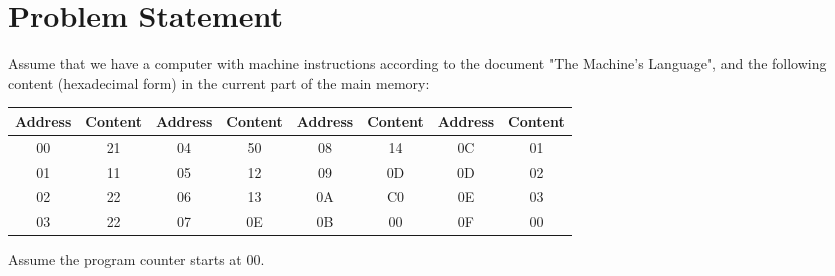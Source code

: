 \section{Problem Statement}

Assume that we have a computer with machine instructions according to the document "The Machine's Language", and the following content (hexadecimal form) in the current part of the main memory:

\begin{center}
\begin{tabular}{|c|c|c|c|c|c|c|c|}
\hline
\textbf{Address} & \textbf{Content} & \textbf{Address} & \textbf{Content} & \textbf{Address} & \textbf{Content} & \textbf{Address} & \textbf{Content} \\
\hline
00 & 21 & 04 & 50 & 08 & 14 & 0C & 01 \\
01 & 11 & 05 & 12 & 09 & 0D & 0D & 02 \\
02 & 22 & 06 & 13 & 0A & C0 & 0E & 03 \\
03 & 22 & 07 & 0E & 0B & 00 & 0F & 00 \\
\hline
\end{tabular}
\end{center}

Assume the program counter starts at 00.
